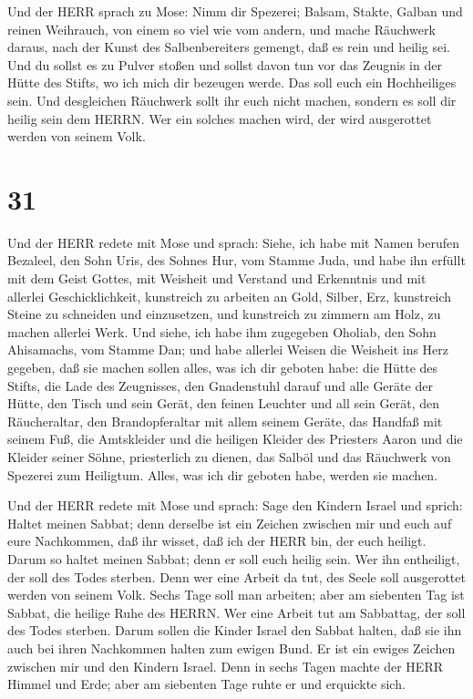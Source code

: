  Und der HERR sprach zu Mose: Nimm dir Spezerei; Balsam,
Stakte, Galban und reinen Weihrauch, von einem so viel wie vom andern,
 und mache Räuchwerk daraus, nach der Kunst des
Salbenbereiters gemengt, daß es rein und heilig sei.  Und
du sollst es zu Pulver stoßen und sollst davon tun vor das Zeugnis in
der Hütte des Stifts, wo ich mich dir bezeugen werde. Das soll euch ein
Hochheiliges sein.  Und desgleichen Räuchwerk sollt ihr
euch nicht machen, sondern es soll dir heilig sein dem HERRN.
 Wer ein solches machen wird, der wird ausgerottet werden
von seinem Volk.

\hypertarget{section-30}{%
\section{31}\label{section-30}}

 Und der HERR redete mit Mose und sprach: 
Siehe, ich habe mit Namen berufen Bezaleel, den Sohn Uris, des Sohnes
Hur, vom Stamme Juda,  und habe ihn erfüllt mit dem Geist
Gottes, mit Weisheit und Verstand und Erkenntnis und mit allerlei
Geschicklichkeit,  kunstreich zu arbeiten an Gold, Silber,
Erz,  kunstreich Steine zu schneiden und einzusetzen, und
kunstreich zu zimmern am Holz, zu machen allerlei Werk.  Und
siehe, ich habe ihm zugegeben Oholiab, den Sohn Ahisamachs, vom Stamme
Dan; und habe allerlei Weisen die Weisheit ins Herz gegeben, daß sie
machen sollen alles, was ich dir geboten habe:  die Hütte
des Stifts, die Lade des Zeugnisses, den Gnadenstuhl darauf und alle
Geräte der Hütte,  den Tisch und sein Gerät, den feinen
Leuchter und all sein Gerät, den Räucheraltar,  den
Brandopferaltar mit allem seinem Geräte, das Handfaß mit seinem Fuß,
 die Amtskleider und die heiligen Kleider des Priesters
Aaron und die Kleider seiner Söhne, priesterlich zu dienen,
 das Salböl und das Räuchwerk von Spezerei zum Heiligtum.
Alles, was ich dir geboten habe, werden sie machen.

 Und der HERR redete mit Mose und sprach: 
Sage den Kindern Israel und sprich: Haltet meinen Sabbat; denn derselbe
ist ein Zeichen zwischen mir und euch auf eure Nachkommen, daß ihr
wisset, daß ich der HERR bin, der euch heiligt.  Darum so
haltet meinen Sabbat; denn er soll euch heilig sein. Wer ihn entheiligt,
der soll des Todes sterben. Denn wer eine Arbeit da tut, des Seele soll
ausgerottet werden von seinem Volk.  Sechs Tage soll man
arbeiten; aber am siebenten Tag ist Sabbat, die heilige Ruhe des HERRN.
Wer eine Arbeit tut am Sabbattag, der soll des Todes sterben.
 Darum sollen die Kinder Israel den Sabbat halten, daß sie
ihn auch bei ihren Nachkommen halten zum ewigen Bund.  Er
ist ein ewiges Zeichen zwischen mir und den Kindern Israel. Denn in
sechs Tagen machte der HERR Himmel und Erde; aber am siebenten Tage
ruhte er und erquickte sich.

